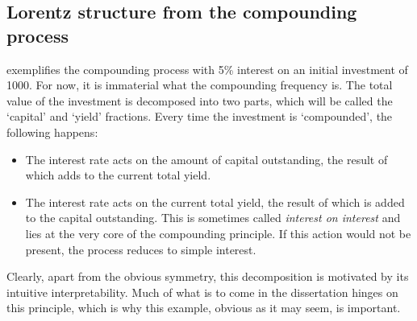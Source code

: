 \subsection{Lorentz structure from the compounding process}
 exemplifies the compounding process with 5\% interest on an initial investment of \si{\money}1000. For now, it is immaterial what the compounding frequency is. The total value of the investment is decomposed into two parts, which will be called the `capital' and `yield' fractions. Every time the investment is `compounded', the following happens:
\begin{itemize}
    \item The interest rate acts on the amount of capital outstanding, the result of which adds to the current total yield.
    \item The interest rate acts on the current total yield, the result of which is added to the capital outstanding. This is sometimes called \textit{interest on interest} and lies at the very core of the compounding principle. If this action would not be present, the process reduces to simple interest.
\end{itemize}
Clearly, apart from the obvious symmetry, this decomposition is motivated by its intuitive interpretability. Much of what is to come in the dissertation hinges on this principle, which is why this example, obvious as it may seem, is important. 
